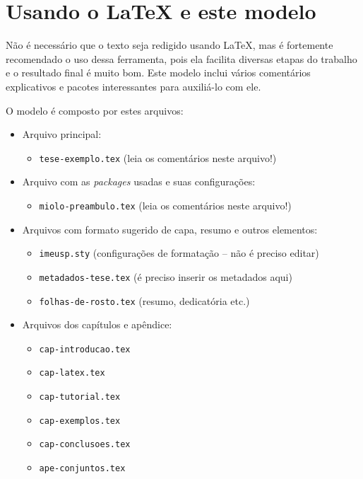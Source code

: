 \chapter{Usando o \LaTeX{} e este modelo}

Não é necessário que o texto seja redigido usando \LaTeX{}, mas é fortemente
recomendado o uso dessa ferramenta, pois ela facilita diversas etapas do
trabalho e o resultado final é muito bom. Este modelo inclui vários
comentários explicativos e pacotes interessantes para auxiliá-lo com ele.

O modelo é composto por estes arquivos:

\begin{itemize}
  \item Arquivo principal:
  \begin{itemize}
    \item \texttt{tese-exemplo.tex} (leia os comentários neste arquivo!)
  \end{itemize}

  \item Arquivo com as \textit{packages} usadas e suas configurações:
  \begin{itemize}
    \item \texttt{miolo-preambulo.tex} (leia os comentários neste arquivo!)
  \end{itemize}

  \item Arquivos com formato sugerido de capa, resumo e outros elementos:
  \begin{itemize}
    \item \texttt{imeusp.sty} (configurações de formatação -- não é preciso editar)
    \item \texttt{metadados-tese.tex} (é preciso inserir os metadados aqui)
    \item \texttt{folhas-de-rosto.tex} (resumo, dedicatória etc.)
  \end{itemize}

  \item Arquivos dos capítulos e apêndice:
  \begin{itemize}
    \item \texttt{cap-introducao.tex}
    \item \texttt{cap-latex.tex}
    \item \texttt{cap-tutorial.tex}
    \item \texttt{cap-exemplos.tex}
    \item \texttt{cap-conclusoes.tex}
    \item \texttt{ape-conjuntos.tex}
  \end{itemize}


\end{itemize}
